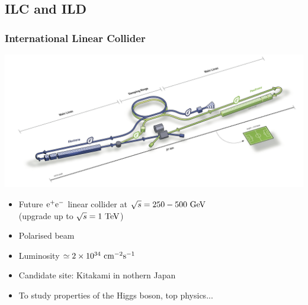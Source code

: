 \documentclass{beamer}
\begin{document}



    
    \subsection{ILC and ILD}

  \begin{frame}
    \frametitle{International Linear Collider}

    \vspace{-0.3cm}
    \begin{center}
      \includegraphics[width = 9 cm]{Pictures/ILC.png}
    \end{center}

    \vspace{-0.3cm}
    \begin{itemize}
      \item Future $\rm{e}^+\rm{e}^-$ linear collider at $\sqrt{s} = 250 - 500~\rm{GeV}$ \\ (upgrade up to $\sqrt{s} = 1~\rm{TeV}$)
      \item Polarised beam
      \item Luminosity $\simeq 2 \times 10^{34}~\rm{cm}^{-2}\rm{s}^{-1}$
      \item Candidate site: Kitakami in nothern Japan
      \item To study properties of the Higgs boson, top physics...
    \end{itemize}
  \end{frame}
 
\end{document}
